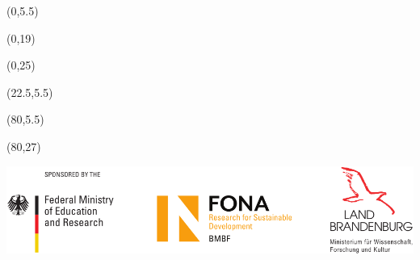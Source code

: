 \documentclass[28pt]{beamer}
\begin{document}
    \begin{frame}

        \begin{textblock}{20}(0,5.5)
            
        \end{textblock}

        \begin{textblock}{20}(0,19)
            
        \end{textblock}

        \begin{textblock}{20}(0,25)
            
        \end{textblock}

        \begin{textblock}{55}(22.5,5.5)
            
        \end{textblock}

        \begin{textblock}{20}(80,5.5)
            
        \end{textblock}


%
        \begin{textblock}{20}(80,27)
            \begin{WhiteBox}
                \vspace{-1cm}
                \begin{block}{}
                    \includegraphics[width=\textwidth]{img/Sponsor_logos}
                \end{block}
            \end{WhiteBox}
        \end{textblock}
    \end{frame}
\end{document}
